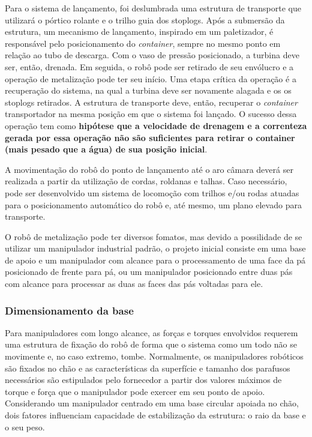 Para o sistema de lançamento, foi deslumbrada uma estrutura de transporte que
utilizará o pórtico rolante e o trilho guia dos stoplogs. Após a submersão da
estrutura, um mecanismo de lançamento, inspirado em um paletizador, é
responsável pelo posicionamento do \textit{container}, sempre no mesmo ponto em
relação ao tubo de descarga. Com o vaso de pressão posicionado, a turbina deve
ser, então, drenada. Em seguida, o robô pode ser retirado de seu
envólucro e a operação de metalização pode ter seu início. Uma etapa crítica da
operação é a recuperação do sistema, na qual a turbina deve ser novamente
alagada e os os stoplogs retirados. A estrutura de transporte deve, então,
recuperar o \textit{container} transportador na mesma posição em que o sistema
foi lançado. O sucesso dessa operação tem como \textbf{hipótese que a velocidade
de drenagem e a correnteza gerada por essa operação não são suficientes para
retirar o container (mais pesado que a água) de sua posição inicial}. 

A movimentação do robô do ponto de lançamento até o aro câmara deverá ser
realizada a partir da utilização de cordas, roldanas e talhas. Caso necessário,
pode ser desenvolvido um sistema de locomoção com trilhos e/ou rodas atuadas
para o posicionamento automático do robô e, até mesmo, um plano elevado para
transporte.

O robô de metalização pode ter diversos fomatos, mas devido a possilidade de se
utilizar um manipulador industrial padrão, o projeto inicial consiste em uma
base de apoio e um manipulador com alcance para o processamento de uma face da
pá posicionado de frente para pá, ou um manipulador posicionado entre duas pás com
alcance para processar as duas as faces das pás voltadas para ele.

\subsubsection{Dimensionamento da base}

Para manipuladores com longo alcance, as forças e torques envolvidos requerem
uma estrutura de fixação do robô de forma que o sistema como um todo não se
movimente e, no caso extremo, tombe. Normalmente, os manipuladores robóticos são
fixados no chão e as características da superfície e tamanho dos parafusos
necessários são estipulados pelo fornecedor a partir dos valores máximos de
torque e força que o manipulador pode exercer em seu ponto de apoio.
Considerando um manipulador centrado em uma base circular apoiada no chão, dois
fatores influenciam capacidade de estabilização da estrutura: o raio da base e o seu peso.

